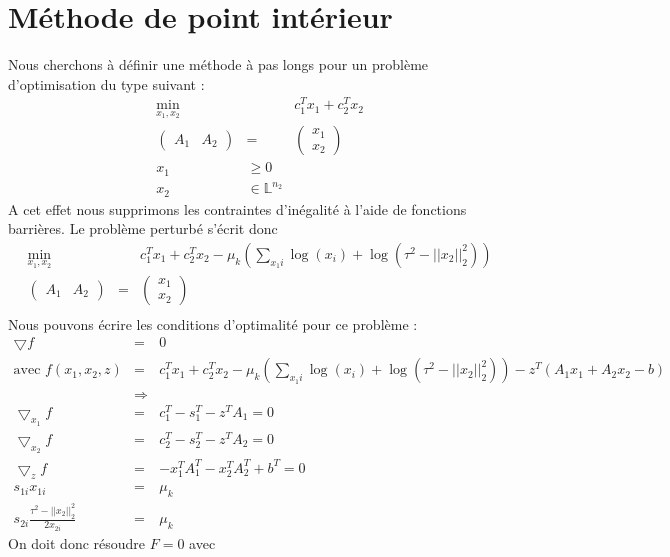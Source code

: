 \section{Méthode de point intérieur}

Nous cherchons à définir une méthode à pas longs pour un problème d'optimisation du type suivant :
\begin{eqnarray*}
\min_{x_1,x_2} & & c_1^Tx_1+c_2^Tx_2\\
\begin{pmatrix} A_1 & A_2 \end{pmatrix}
& = & \begin{pmatrix} x_1 \\ x_2 \end{pmatrix} \\
x_1 & \geq 0 \\
x_2 & \in \mathbb{L}^{n_2}
\end{eqnarray*}
A cet effet nous supprimons les contraintes d'inégalité à l'aide de fonctions barrières. Le problème perturbé s'écrit donc
\begin{eqnarray*}
\min_{x_1,x_2} & & c_1^Tx_1+c_2^Tx_2 - \mu_k(\sum_{x_1i} \log(x_i)+ \log(\tau^2 - ||x_2||_2^2)) \\
\begin{pmatrix} A_1 & A_2 \end{pmatrix}
& = & \begin{pmatrix} x_1 \\ x_2 \end{pmatrix} \\
\end{eqnarray*}
Nous pouvons écrire les conditions d'optimalité pour ce problème :
\begin{eqnarray*}
\bigtriangledown f & = & 0 \\
\text{avec }f(x_1,x_2,z) & = & 
c_1^Tx_1+c_2^Tx_2 - \mu_k(\sum_{x_1i} \log(x_i)+ \log(\tau^2 - ||x_2||_2^2)) -z^T(A_1x_1+A_2x_2-b)\\
& \Rightarrow & \\
\bigtriangledown_{x_1}f & = & c_1^T -s_1^T -z^TA_1 = 0 \\
\bigtriangledown_{x_2}f & = & c_2^T -s_2^T - z^TA_2 = 0 \\
\bigtriangledown_{z}f & = & -x_1^TA_1^T-x_2^TA_2^T+b^T = 0 \\
s_{1i} x_{1i} & = & \mu_k \\
s_{2i} \frac{\tau^2 - ||x_{2}||_2^2}{2x_{2i}} & = & \mu_k
\end{eqnarray*}
On doit donc résoudre $F=0 $ avec 
